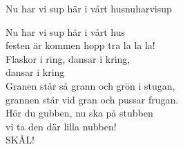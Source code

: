 \begin{song}{Nu har vi sup här i vårt hus}{nuharvisup}
\begin{vers}
Nu har vi sup här i vårt hus\\
festen är kommen hopp tra la la la!\\
Flaskor i ring, dansar i kring,\\
dansar i kring\\
Granen står så grann och grön i stugan,\\
grannen står vid gran och pussar frugan.\\ 
Hör du gubben, nu ska på stubben\\
vi ta den där lilla nubben!\\
SKÅL!\\
\end{vers}
\end{song}
